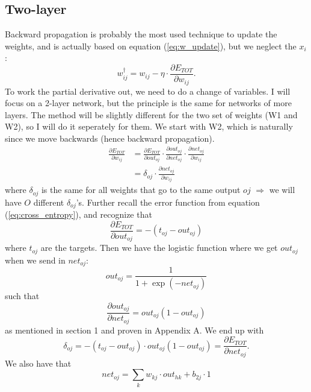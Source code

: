 \subsection{Two-layer}
Backward propagation is probably the most used technique to update the weights, and is actually based on equation (\ref{eq:w_update}), but we neglect the $x_i$:
\begin{equation}
w_{ij}^{\dagger}=w_{ij} - \eta\cdot \frac{\partial E_{TOT}}{\partial w_{ij}}.
\end{equation}
To work the partial derivative out, we need to do a change of variables. I will focus on a 2-layer network, but the principle is the same for networks of more layers. The method will be slightly different for the two set of weights (W1 and W2), so I will do it seperately for them. We start with W2, which is naturally since we move backwards (hence backward propagation). 
\begin{align}
\frac{\partial E_{TOT}}{\partial w_{ij}}&=\frac{\partial E_{TOT}}{\partial out_{oj}}\cdot\frac{\partial out_{oj}}{\partial net_{oj}}\cdot\frac{\partial net_{oj}}{\partial w_{ij}}\\
&=\delta_{oj}\cdot\frac{\partial net_{oj}}{\partial w_{ij}}
\end{align}
where $\delta_{oj}$ is the same for all weights that go to the same output $oj$ $\Rightarrow$ we will have $O$ different $\delta_{oj}$'s. Further recall the error function from equation (\ref{eq:cross_entropy}), and recognize that
\begin{equation}
\frac{\partial E_{TOT}}{\partial out_{oj}}=-(t_{oj}-out_{oj})
\end{equation}
where $t_{oj}$ are the targets. Then we have the logistic function where we get $out_{oj}$ when we send in $net_{oj}$:
\begin{equation}
out_{oj}=\frac{1}{1+\exp(-net_{oj})}
\end{equation}
such that
\begin{equation}
\frac{\partial out_{oj}}{\partial net_{oj}}=out_{oj}(1-out_{oj})
\end{equation}
as mentioned in section 1 and proven in Appendix A. We end up with
\begin{equation}
\delta_{oj}=-(t_{oj}-out_{oj})\cdot out_{oj}(1-out_{oj})=\frac{\partial E_{TOT}}{\partial net_{oj}}.
\end{equation}
We also have that
\begin{equation}
net_{oj}=\sum_k w_{kj}\cdot out_{hk} + b_{2j}\cdot 1
\end{equation}

